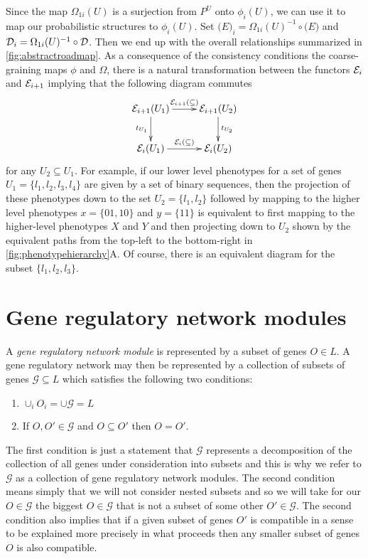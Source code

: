 Since the map $\Omega_{1i}(U)$ is a surjection from $P^U$ onto $\phi_i(U)$, we can use it to map our probabilistic structures to $\phi_i(U)$.  Set $\mathcal(E)_i = \Omega_{1i}(U)^{-1} \circ \mathcal(E)$ and $\mathcal{D}_i = \Omega_{1i}(U)^{-1} \circ \mathcal{D}$.  Then we end up with the overall relationships summarized in \ref{fig:abstractroadmap}. As a consequence of the consistency conditions the coarse-graining maps $\phi$ and $\Omega$, there is a natural transformation between the functors $\mathcal{E}_i$ and $\mathcal{E}_{i+1}$ implying that the following diagram commutes
$$
\xymatrix{
\expr_{i+1}(U_1) \ar[r]^{\expr_{i+1}(\subseteq)} \ar[d]_{t_{U_1}} & \expr_{i+1}(U_2) \ar[d]^{t_{U_2}} \\
\expr_{i}(U_1) \ar[r]^{\expr_{i}(\subseteq)} & \expr_{i}(U_2) }
$$
for any $U_2 \subseteq U_1$. For example, if our lower level phenotypes for a set of genes $U_1 = \{ l_1,l_2,l_3,l_4 \}$ are given by a set of binary sequences, then the projection of these phenotypes down to the set $U_2 = \{l_1,l_2\}$ followed by mapping to the higher level phenotypes $x=\{01,10\}$ and $y=\{11\}$ is equivalent to first mapping to the higher-level phenotypes $X$ and $Y$ and then projecting down to $U_2$ shown by the equivalent paths from the top-left to the bottom-right in \ref{fig:phenotypehierarchy}A.
Of course, there is an equivalent diagram for the subset $\{ l_1,l_2,l_3 \}$.

\section{Gene regulatory network modules}\label{sec:covergenotypespace}
A \emph{gene regulatory network module} is represented by a subset of genes $O \in L$. A gene regulatory network may then be represented by a collection of subsets of genes $\mathcal{G} \subseteq L$ which satisfies the following two conditions:
\begin{enumerate}
\item $\cup_i O_i = \cup \mathcal{G} = L$
\item If $O,O' \in \mathcal{G}$ and $O \subseteq O'$ then $O = O'$.
\end{enumerate}
The first condition is just a statement that $\mathcal{G}$ represents a decomposition of the collection of all genes under consideration into subsets and this is why we refer to $\mathcal{G}$ as a collection of gene regulatory network modules. The second condition means simply that we will not consider nested subsets and so we will take for our $O \in \mathcal{G}$ the biggest $O \in \mathcal{G}$ that is not a subset of some other $O' \in \mathcal{G}$. The second condition also implies that if a given subset of genes $O'$ is compatible in a sense to be explained more precisely in what proceeds then any smaller subset of genes $O$ is also compatible.

